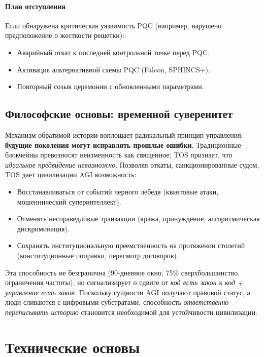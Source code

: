 \documentclass[11pt]{article}
\begin{document}
\paragraph{План отступления}
Если обнаружена критическая уязвимость PQC (например, нарушено предположение о жесткости решетки):
\begin{itemize}[noitemsep]
  \item Аварийный откат к последней контрольной точке перед PQC.
  \item Активация альтернативной схемы PQC (Falcon, SPHINCS+).
  \item Повторный созыв церемонии с обновленными параметрами.
\end{itemize}

\subsection{Философские основы: временной суверенитет}

Механизм обратимой истории воплощает радикальный принцип управления: \textbf{будущие поколения могут исправлять прошлые ошибки}. Традиционные блокчейны превозносят неизменность как священное; TOS признает, что \emph{идеальное предвидение невозможно}. Позволяя откаты, санкционированные судом, TOS дает цивилизации AGI возможность:
\begin{itemize}[noitemsep]
  \item Восстанавливаться от событий черного лебедя (квантовые атаки, мошеннический суперинтеллект).
  \item Отменять несправедливые транзакции (кража, принуждение, алгоритмическая дискриминация).
  \item Сохранять институциональную преемственность на протяжении столетий (конституционные поправки, пересмотр договоров).
\end{itemize}

Эта способность не безгранична (90-дневное окно, 75\% сверхбольшинство, ограничения частоты), но сигнализирует о сдвиге от \emph{код есть закон} к \emph{код + управление есть закон}. Поскольку сущности AGI получают правовой статус, а люди сливаются с цифровыми субстратами, способность \emph{ответственно переписывать историю} становится необходимой для устойчивости цивилизации.

\section{Технические основы}
\end{document}
